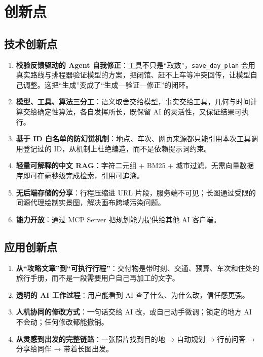 \documentclass[a4paper]{article}
\def\labelenumi{\arabic{enumi}.}
\begin{document}
\section{创新点}

\subsection{技术创新点}

\begin{enumerate}
\def\labelenumi{\arabic{enumi}.}
\item
  \textbf{校验反馈驱动的 Agent 自我修正}：工具不只是``取数''，\texttt{save\_day\_plan}
  会用真实路线与排程器验证模型的方案，把闭馆、赶不上车等冲突回传，让模型自己调整。这把``生成''变成了``生成---验证---修正''的闭环。
\item
  \textbf{模型、工具、算法三分工}：语义取舍交给模型，事实交给工具，几何与时间计算交给确定性算法，各自发挥所长，既保留 AI 的灵活性，又保证结果可执行。
\item
  \textbf{基于 ID 白名单的防幻觉机制}：地点、车次、网页来源都只能引用本次工具调用登记过的 ID，从机制上杜绝编造，而不是依赖提示词约束。
\item
  \textbf{轻量可解释的中文 RAG}：字符二元组 + BM25 + 城市过滤，无需向量数据库即可在毫秒级完成检索，引用可追溯。
\item
  \textbf{无后端存储的分享}：行程压缩进 URL 片段，服务端不可见；长图通过受限的同源代理绘制实景图，解决画布跨域污染问题。
\item
  \textbf{能力开放}：通过 MCP Server 把规划能力提供给其他 AI 客户端。
\end{enumerate}

\subsection{应用创新点}

\begin{enumerate}
\def\labelenumi{\arabic{enumi}.}
\item
  \textbf{从``攻略文章''到``可执行行程''}：交付物是带时刻、交通、预算、车次和住处的旅行手册，而不是一段需要用户自己再加工的文字。
\item
  \textbf{透明的 AI 工作过程}：用户能看到 AI 查了什么、为什么改，信任感更强。
\item
  \textbf{人机协同的修改方式}：一句话交给 AI 改，或自己动手微调；锁定的地方 AI 不会动；任何修改都能撤销。
\item
  \textbf{从灵感到出发的完整链路}：一张照片找到目的地 → 自动规划 → 行前问答 → 分享给同伴 → 带着长图出发。
\end{enumerate}
\end{document}
